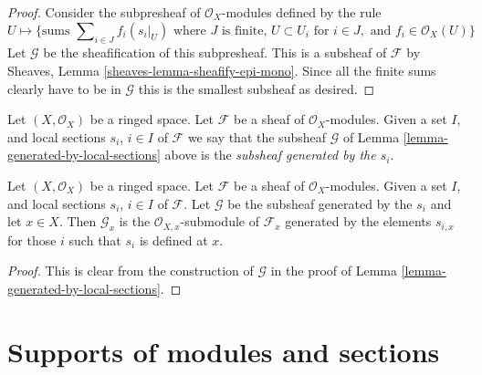 \begin{proof}
Consider the subpresheaf of $\mathcal{O}_X$-modules
defined by the rule
$$
U
\longmapsto
\{
\text{sums } \sum\nolimits_{i \in J} f_i (s_i|_U)
\text{ where } J \text{ is finite, }
U \subset U_i \text{ for } i\in J, \text{ and }
f_i \in \mathcal{O}_X(U)
\}
$$
Let $\mathcal{G}$ be the sheafification of this subpresheaf.
This is a subsheaf of $\mathcal{F}$ by
Sheaves, Lemma \ref{sheaves-lemma-sheafify-epi-mono}.
Since all the finite sums clearly have to be in $\mathcal{G}$
this is the smallest subsheaf as desired.
\end{proof}

\begin{definition}
\label{definition-generated-by-local-sections}
Let $(X, \mathcal{O}_X)$ be a ringed space.
Let $\mathcal{F}$ be a sheaf of $\mathcal{O}_X$-modules.
Given a set $I$, and
local sections $s_i$, $i \in I$ of $\mathcal{F}$
we say that the subsheaf $\mathcal{G}$ of
Lemma \ref{lemma-generated-by-local-sections}
above is the {\it subsheaf generated by the $s_i$}.
\end{definition}

\begin{lemma}
\label{lemma-generated-by-local-sections-stalk}
Let $(X, \mathcal{O}_X)$ be a ringed space.
Let $\mathcal{F}$ be a sheaf of $\mathcal{O}_X$-modules.
Given a set $I$, and
local sections $s_i$, $i \in I$ of $\mathcal{F}$.
Let $\mathcal{G}$ be the subsheaf generated by the
$s_i$ and let $x\in X$.
Then $\mathcal{G}_x$ is the $\mathcal{O}_{X, x}$-submodule of
$\mathcal{F}_x$ generated by the elements $s_{i, x}$
for those $i$ such that $s_i$ is defined at $x$.
\end{lemma}

\begin{proof}
This is clear from the construction of $\mathcal{G}$
in the proof of Lemma \ref{lemma-generated-by-local-sections}.
\end{proof}










\section{Supports of modules and sections}
\label{section-support}


